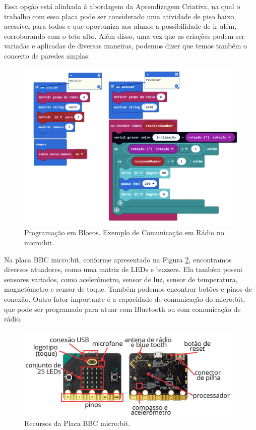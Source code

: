 \documentclass[portuguese]{textolivre}
\begin{document}
Essa opção está alinhada à abordagem da Aprendizagem Criativa, na qual o trabalho com essa placa pode ser considerado uma atividade de piso baixo, acessível para todos e que oportuniza aos alunos a possibilidade de ir além, corroborando com o teto alto. Além disso, uma vez que as criações podem ser variadas e aplicadas de diversas maneiras, podemos dizer que temos também o conceito de paredes amplas.


\begin{figure}[h!]
\centering
\begin{minipage}{1\textwidth}
 \includegraphics[width=0.87\linewidth, height=0.41\textheight]{Figuras/figura02.png}
 \caption{Programação em Blocos. Exemplo de Comunicação em Rádio no micro:bit.}
 \label{fig-img-a}
\end{minipage}
\end{figure}

Na placa BBC micro:bit, conforme apresentado na Figura \ref{fig-img-microbit}, encontramos diversos atuadores, como uma matriz de LEDs e buzzers. Ela também possui sensores variados, como acelerômetro, sensor de luz, sensor de temperatura, magnetômetro e sensor de toque. Também podemos encontrar botões e pinos de conexão. Outro fator importante é a capacidade de comunicação do micro:bit, que pode ser programado para atuar com Bluetooth ou com comunicação de rádio.

\begin{figure}[H]
\centering
\begin{minipage}{.7\textwidth}
 \includegraphics[width=\textwidth]{Figuras/figura03}
 \caption{Recursos da Placa BBC micro:bit.}
 \label{fig-img-microbit}
\end{minipage}
\end{figure}
\end{document}
